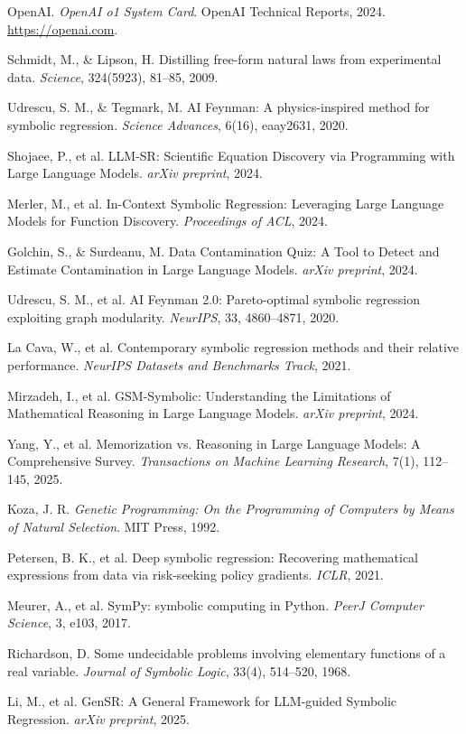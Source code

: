 \documentclass[11pt]{article}
\begin{document}
\begin{enumerate}[label={[{\arabic*}]}]
  \item OpenAI. \textit{OpenAI o1 System Card}. OpenAI Technical Reports, 2024. \url{https://openai.com}.
  \item Schmidt, M., \& Lipson, H. Distilling free-form natural laws from experimental data. \textit{Science}, 324(5923), 81--85, 2009.
  \item Udrescu, S. M., \& Tegmark, M. AI Feynman: A physics-inspired method for symbolic regression. \textit{Science Advances}, 6(16), eaay2631, 2020.
  \item Shojaee, P., et al. LLM-SR: Scientific Equation Discovery via Programming with Large Language Models. \textit{arXiv preprint}, 2024.
  \item Merler, M., et al. In-Context Symbolic Regression: Leveraging Large Language Models for Function Discovery. \textit{Proceedings of ACL}, 2024.
  \item Golchin, S., \& Surdeanu, M. Data Contamination Quiz: A Tool to Detect and Estimate Contamination in Large Language Models. \textit{arXiv preprint}, 2024.
  \item Udrescu, S. M., et al. AI Feynman 2.0: Pareto-optimal symbolic regression exploiting graph modularity. \textit{NeurIPS}, 33, 4860--4871, 2020.
  \item La Cava, W., et al. Contemporary symbolic regression methods and their relative performance. \textit{NeurIPS Datasets and Benchmarks Track}, 2021.
  \item Mirzadeh, I., et al. GSM-Symbolic: Understanding the Limitations of Mathematical Reasoning in Large Language Models. \textit{arXiv preprint}, 2024.
  \item Yang, Y., et al. Memorization vs. Reasoning in Large Language Models: A Comprehensive Survey. \textit{Transactions on Machine Learning Research}, 7(1), 112--145, 2025.
  \item Koza, J. R. \textit{Genetic Programming: On the Programming of Computers by Means of Natural Selection}. MIT Press, 1992.
  \item Petersen, B. K., et al. Deep symbolic regression: Recovering mathematical expressions from data via risk-seeking policy gradients. \textit{ICLR}, 2021.
  \item Meurer, A., et al. SymPy: symbolic computing in Python. \textit{PeerJ Computer Science}, 3, e103, 2017.
  \item Richardson, D. Some undecidable problems involving elementary functions of a real variable. \textit{Journal of Symbolic Logic}, 33(4), 514--520, 1968.
  \item Li, M., et al. GenSR: A General Framework for LLM-guided Symbolic Regression. \textit{arXiv preprint}, 2025.
\end{enumerate}
\end{document}
